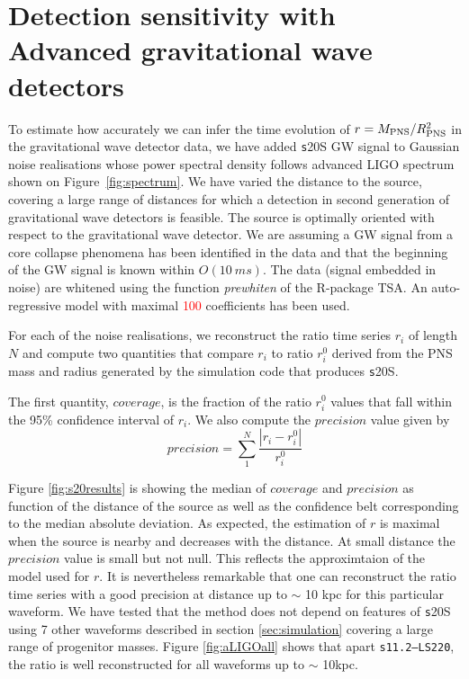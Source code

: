 \section{Detection sensitivity with Advanced gravitational wave detectors}
\label{sec:results}

To estimate how accurately we can infer the time evolution of $r=M_{\rm PNS}/R_{\rm PNS}^2$ in the
gravitational wave detector data, we have added {\texttt s20S} GW signal to 
Gaussian noise realisations whose power spectral density follows advanced LIGO
spectrum~\cite{aLIGOsens:2018} shown on Figure~\ref{fig:spectrum}. 
We have varied the distance to the source, covering a large
range of distances for which a detection in second generation of gravitational wave detectors
is feasible. The source is optimally oriented with
respect to the gravitational wave detector. We are assuming a GW signal from a core collapse
phenomena has been identified in the data and that the beginning of the GW signal is known within $O(10~ms)$.
The data (signal embedded in noise) are whitened using the function {\it prewhiten} of the R-package TSA.
An auto-regressive model with maximal \textcolor{red}{100} coefficients has been used.    

For each of the noise realisations, we reconstruct the ratio time series {$r_i$}
of length $N$ and compute two quantities that compare {$r_i$} to ratio {$r_i^0$} derived from
the PNS mass and radius generated by the simulation code that produces {\texttt s20S}.

The first quantity, $coverage$, is the fraction of the
ratio {$r_i^0$} values that fall within the 95\% confidence interval of {$r_i$}.
We also compute the $precision$ value given by
\begin{equation}
precision=\sum_1^N\frac{|r_i-r_i^0|}{r_i^0}
\end{equation}

Figure \ref{fig:s20results} is showing the median of $coverage$ and $precision$ as
function of the distance of the source as well as the confidence belt corresponding
to the median absolute deviation. As expected, the estimation of $r$ is maximal when
the source is nearby and decreases with the distance. At small distance the $precision$
value is small but not null. This reflects the approximtaion of the model used for $r$.
It is nevertheless remarkable that one can reconstruct the ratio time series with a good
precision at distance up to $\sim$ 10 kpc for this particular waveform. We have tested
that the method does not depend on features of {\texttt s20S} using 7 other waveforms
described in section \ref{sec:simulation} covering a large range of progenitor masses.
Figure \ref{fig:aLIGOall} shows that apart {\tt s11.2--LS220}, the ratio is well
reconstructed for all waveforms up to $\sim$ 10kpc. 

